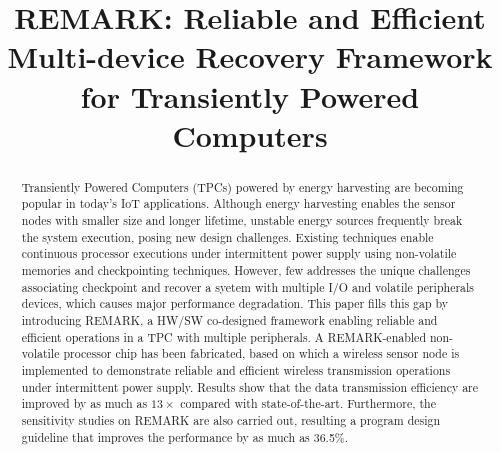 \documentclass[pageno]{jpaper}
\begin{document}
\title{REMARK: Reliable and Efficient Multi-device Recovery Framework for Transiently Powered Computers}

\date{}
\maketitle

\thispagestyle{empty}

\begin{abstract}
Transiently Powered Computers (TPCs) powered by energy harvesting are becoming popular in today's IoT applications. Although energy harvesting enables the sensor nodes with smaller size and longer lifetime, unstable energy sources frequently break the system execution, posing new design challenges. Existing techniques enable continuous processor executions under intermittent power supply using non-volatile memories and checkpointing techniques. However, few addresses the unique challenges associating checkpoint and recover a syetem with multiple I/O and volatile peripherals devices, which causes major performance degradation. This paper fills this gap by introducing REMARK, a HW/SW co-designed framework enabling reliable and efficient operations in a TPC with multiple peripherals. A REMARK-enabled non-volatile processor chip has been fabricated, based on which a wireless sensor node is implemented to demonstrate reliable and efficient wireless transmission operations under intermittent power supply. Results show that the data transmission efficiency are improved by as much as $13\times$ compared with state-of-the-art. Furthermore, the sensitivity studies on REMARK are also carried out, resulting a program design guideline that improves the performance by as much as 36.5\%.
\end{abstract}

\begin{spacing}{0.90}










\end{spacing}




\end{document}
